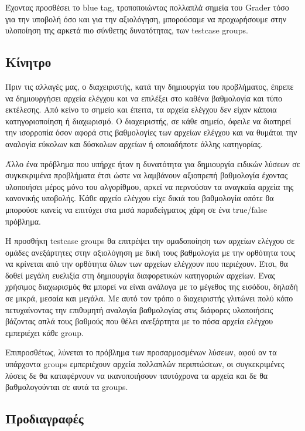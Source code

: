 \documentclass[diploma]{softlab-thesis}
\begin{document}
Έχοντας προσθέσει το blue tag, τροποποιώντας πολλαπλά σημεία του Grader τόσο
για την υποβολή όσο και για την αξιολόγηση, μπορούσαμε να προχωρήσουμε στην
υλοποίηση της αρκετά πιο σύνθετης δυνατότητας, των testcase groups.

\subsection{Κίνητρο}

Πριν τις αλλαγές μας, ο διαχειριστής, κατά την δημιουργία του προβλήματος,
έπρεπε να δημιουργήσει αρχεία ελέγχου και να επιλέξει στο καθένα βαθμολογία και
τύπο εκτέλεσης. Από κείνο το σημείο και έπειτα, τα αρχεία ελέγχου δεν είχαν
κάποια κατηγοριοποίηση ή διαχωρισμό. Ο διαχειριστής, σε κάθε σημείο, όφειλε να
διατηρεί την ισορροπία όσον αφορά στις βαθμολογίες των αρχείων ελέγχου και να
θυμάται την αναλογία εύκολων και δύσκολων αρχείων ή οποιαδήποτε άλλης
κατηγορίας.

\bigskip

Άλλο ένα πρόβλημα που υπήρχε ήταν η δυνατότητα για δημιουργία ειδικών λύσεων σε
συγκεκριμένα προβλήματα έτσι ώστε να λαμβάνουν αξιοπρεπή βαθμολογία έχοντας
υλοποιήσει μέρος μόνο του αλγορίθμου, αρκεί να περνούσαν τα αναγκαία αρχεία της
κανονικής υποβολής. Κάθε αρχείο ελέγχου είχε δικιά του βαθμολογία οπότε θα
μπορούσε κανείς να επιτύχει στα μισά παραδείγματος χάρη σε ένα true/false
πρόβλημα.

\bigskip

Η προσθήκη testcase groups θα επιτρέψει την ομαδοποίηση των αρχείων ελέγχου σε
ομάδες ανεξάρτητες στην αξιολόγηση με δική τους βαθμολογία με την ορθότητα τους
να κρίνεται από την ορθότητα όλων των αρχείων ελέγχουν που περιέχουν. Έτσι, θα
δοθεί μεγάλη ευελιξία στη δημιουργία διαφορετικών κατηγοριών αρχείων. Ένας
χρήσιμος διαχωρισμός θα μπορεί να είναι ανάλογα με το μέγεθος της εισόδου,
δηλαδή σε μικρά, μεσαία και μεγάλα. Με αυτό τον τρόπο ο διαχειριστής γλιτώνει
πολύ κόπο πετυχαίνοντας την επιθυμητή αναλογία βαθμολογίας στις διάφορες
υλοποιήσεις βάζοντας απλά τους βαθμούς που θέλει ανεξάρτητα με το πόσα αρχεία
ελέγχου εμπεριέχει κάθε group.

\bigskip

Επιπροσθέτως, λύνεται το πρόβλημα των προσαρμοσμένων λύσεων, αφού αν τα
υπάρχοντα groups εμπεριέχουν αρχεία πολλαπλών περιπτώσεων, οι συγκεκριμένες
λύσεις δε θα καταφέρνουν να ικανοποιήσουν ταυτόχρονα τα αρχεία και δε θα
βαθμολογούνται σε αυτά τα groups.

\subsection{Προδιαγραφές}
\end{document}
